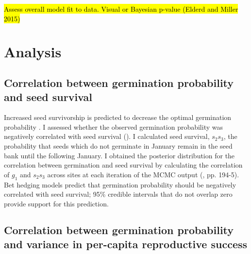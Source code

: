 \documentclass[12pt, oneside, titlepage]{article}   	%
\begin{document}
\hl{Assess overall model fit to data. Visual or Bayesian p-value (Elderd and Miller 2015)}
\fi

\section{Analysis}

\subsection{Correlation between germination probability and seed survival}

Increased seed survivorship is predicted to decrease the optimal germination probability \cite{cohen1966,ellner1985a}. I assessed whether the observed germination probability was negatively correlated with seed survival (\cite{gremer2014}). I calculated seed survival, $s_2 s_3$, the probability that seeds which do not germinate in January remain in the seed bank until the following January. I obtained the posterior distribution for the correlation between germination and seed survival by calculating the correlation of $g_1$ and $s_2 s_3$ across sites at each iteration of the MCMC output (\cite{hobbs2015b}, pp. 194-5). Bet hedging models predict that germination probability should be negatively correlated with seed survival; 95\% credible intervals that do not overlap zero provide support for this prediction.



\subsection{Correlation between germination probability and variance in per-capita reproductive success}
\end{document}
